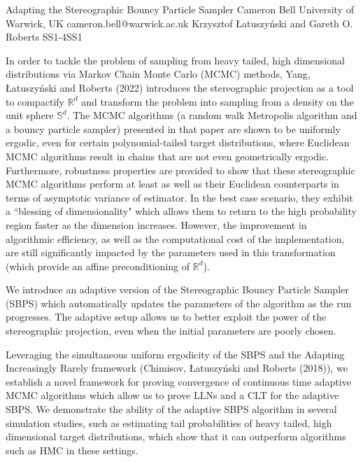 \begin{talk}
  {Adapting the Stereographic Bouncy Particle Sampler}%
  {Cameron Bell}%
  {University of Warwick, UK}%
  {cameron.bell@warwick.ac.uk}%
  {Krzysztof {\L}atuszy{\'n}ski and Gareth O. Roberts}%
{}{}{SS1-4}{SS1}

			

In order to tackle the problem of sampling from heavy tailed, high dimensional distributions via Markov Chain Monte Carlo (MCMC) methods, Yang, {\L}atuszy{\'n}ski and Roberts (2022) introduces the stereographic projection as a tool to compactify $\mathbb{R}^d$ and transform the problem into sampling from a density on the unit sphere $\mathbb{S}^d$. The MCMC algorithms (a random walk Metropolis algorithm and a bouncy particle sampler) presented in that paper are shown to be uniformly ergodic, even for certain polynomial-tailed target distributions, where Euclidean MCMC algorithms result in chains that are not even geometrically ergodic. Furthermore, robustness properties are provided to show that these stereographic MCMC algorithms perform at least as well as their Euclidean counterparts in terms of asymptotic variance of estimator. In the best case scenario, they exhibit a ``blessing of dimensionality" which allows them to return to the high probability region faster as the dimension increases. However, the improvement in algorithmic efficiency, as well as the computational cost of the implementation, are still significantly impacted by the parameters used in this transformation (which provide an affine preconditioning of $\mathbb{R}^d$).

We introduce an adaptive version of the Stereographic Bouncy Particle Sampler (SBPS) which automatically updates the parameters of the algorithm as the run progresses. The adaptive setup allows us to better exploit the power of the stereographic projection, even when the initial parameters are poorly chosen.

Leveraging the simultaneous uniform ergodicity of the SBPS and the Adapting Increasingly Rarely framework (Chimisov, {\L}atuszy{\'n}ski and Roberts (2018)), we establish a novel framework for proving convergence of continuous time adaptive MCMC algorithms which allow us to prove LLNs and a CLT for the adaptive SBPS. We demonstrate the ability of the adaptive SBPS algorithm in several simulation studies, such as estimating tail probabilities of heavy tailed, high dimensional target distributions, which show that it can outperform algorithms such as HMC in these settings.


\end{talk}
